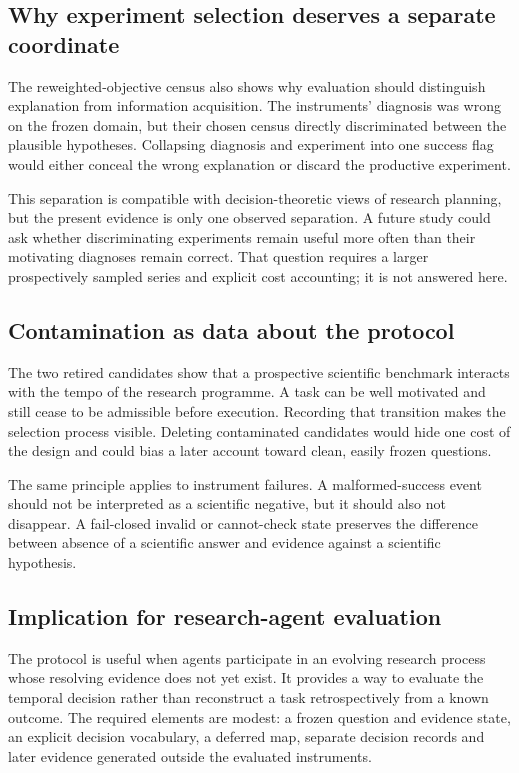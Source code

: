 \documentclass[10pt]{article}
\begin{document}
\subsection{Why experiment selection deserves a separate coordinate}

The reweighted-objective census also shows why evaluation should distinguish explanation from information acquisition. The instruments' diagnosis was wrong on the frozen domain, but their chosen census directly discriminated between the plausible hypotheses. Collapsing diagnosis and experiment into one success flag would either conceal the wrong explanation or discard the productive experiment.

This separation is compatible with decision-theoretic views of research planning, but the present evidence is only one observed separation. A future study could ask whether discriminating experiments remain useful more often than their motivating diagnoses remain correct. That question requires a larger prospectively sampled series and explicit cost accounting; it is not answered here.

\subsection{Contamination as data about the protocol}

The two retired candidates show that a prospective scientific benchmark interacts with the tempo of the research programme. A task can be well motivated and still cease to be admissible before execution. Recording that transition makes the selection process visible. Deleting contaminated candidates would hide one cost of the design and could bias a later account toward clean, easily frozen questions.

The same principle applies to instrument failures. A malformed-success event should not be interpreted as a scientific negative, but it should also not disappear. A fail-closed invalid or cannot-check state preserves the difference between absence of a scientific answer and evidence against a scientific hypothesis.

\subsection{Implication for research-agent evaluation}

The protocol is useful when agents participate in an evolving research process whose resolving evidence does not yet exist. It provides a way to evaluate the temporal decision rather than reconstruct a task retrospectively from a known outcome. The required elements are modest: a frozen question and evidence state, an explicit decision vocabulary, a deferred map, separate decision records and later evidence generated outside the evaluated instruments.
\end{document}
